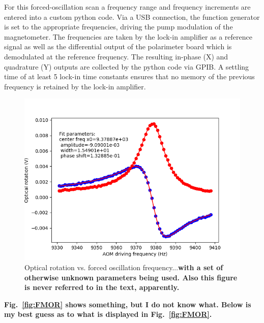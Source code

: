 For this forced-oscillation scan a frequency range and frequency
increments are entered into a custom python code. Via a USB
connection, the function generator is set to the appropriate
frequencies, driving the pump modulation of the magnetometer. The
frequencies are taken by the lock-in amplifier as a reference signal
as well as the differential output of the polarimeter board which is
demodulated at the reference frequency. The resulting in-phase (X) and
quadrature (Y) outputs are collected by the python code via GPIB.  A
settling time of at least 5 lock-in time constants ensures that no
memory of the previous frequency is retained by the lock-in amplifier.
\begin{figure}[h]
\centering\includegraphics[width=0.4\linewidth]{figures/FM_NMOR}
\caption{Optical rotation vs. forced oscillation frequency...{\bf with
    a set of otherwise unknown parameters being used.  Also this
    figure is never referred to in the text, apparently.}}
\end{figure}





{\bf Fig.~\ref{fig:FMOR} shows something, but I do not know what.
  Below is my best guess as to what is displayed in
  Fig.~\ref{fig:FMOR}.}

